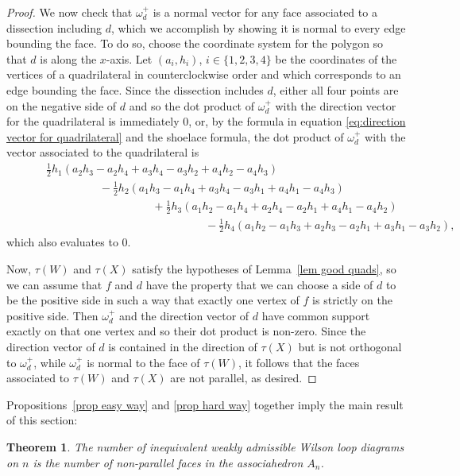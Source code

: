 \documentclass[11pt]{article}
\newtheorem{thm}{Theorem}[section]
\theoremstyle{remark}
\theoremstyle{definition}
\begin{document}
\begin{proof}
    We now check that $\omega^+_d$ is a normal vector for any face associated to a dissection including $d$, which we accomplish by showing it is normal to every edge bounding the face.  To do so, choose the coordinate system for the polygon so that $d$ is along the $x$-axis.  Let $(a_i, h_i)$, $i\in \{1,2,3,4\}$ be the coordinates of the vertices of a quadrilateral in counterclockwise order and which corresponds to an edge bounding the face.  Since the dissection includes $d$, either all four points are on the negative side of $d$ and so the dot product of $\omega^+_d$ with the direction vector for the quadrilateral is immediately $0$, or, by the formula in equation \eqref{eq:direction vector for quadrilateral} and the shoelace formula, the dot product of $\omega^+_d$ with the vector associated to the quadrilateral is
   \begin{align*}
       & \hspace{1cm}\textstyle\frac{1}{2}h_1(a_2h_3-a_2h_4+a_3h_4-a_3h_2+a_4h_2-a_4h_3) \\
       &\hspace{3cm} - \textstyle\frac{1}{2} h_2(a_1h_3-a_1h_4+a_3h_4-a_3h_1+a_4h_1-a_4h_3) \\
       &\hspace{5cm}+ \textstyle\frac{1}{2}h_3(a_1h_2-a_1h_4+a_2h_4-a_2h_1+a_4h_1-a_4h_2) \\
       &\hspace{7cm}- \textstyle\frac{1}{2}h_4(a_1h_2-a_1h_3+a_2h_3-a_2h_1+a_3h_1-a_3h_2), 
    \end{align*}
    which also evaluates to 0.

    Now, $\tau(W)$ and $\tau(X)$ satisfy the hypotheses of Lemma~\ref{lem good quads}, so we can assume that $f$ and $d$ have the property that we can choose a side of $d$ to be the positive side in such a way that exactly one vertex of $f$ is strictly on the positive side.  Then $\omega^+_d$ and the direction vector of $d$ have common support exactly on that one vertex and so their dot product is non-zero.  Since the direction vector of $d$ is contained in the direction of $\tau(X)$ but is not orthogonal to $\omega^+_d$, while $\omega^+_d$ is normal to the face of $\tau(W)$, it follows that the faces associated to $\tau(W)$ and $\tau(X)$ are not parallel, as desired.
\end{proof}


Propositions~\ref{prop easy way} and \ref{prop hard way} together imply the main result of this section:
\begin{thm}\label{thm:count inequiv diagrams}
  The number of inequivalent weakly admissible Wilson loop diagrams on $n$ is the number of non-parallel faces in the associahedron $A_n$.
\end{thm} 
\end{document}
